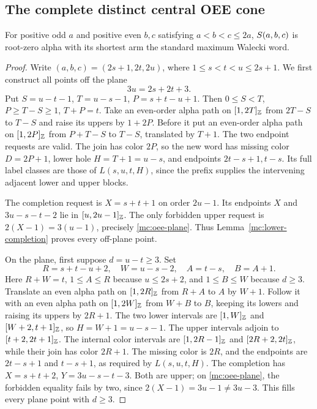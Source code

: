 \subsection{The complete distinct central OEE cone}
\label{mc:oee-central-section}

\begin{proposition}\label{mc:oee-central}
For positive odd $a$ and positive even $b,c$ satisfying
$a<b<c\le2a$, $S\!\left(a,b,c\right)$ is root-zero alpha with its
shortest arm the standard maximum Walecki word.
\end{proposition}
\begin{proof}
Write $(a,b,c)=(2s+1,2t,2u)$, where
$1\le s<t<u\le2s+1$.
We first construct all points off the plane
\begin{equation}\label{mc:oee-plane}
 3u=2s+2t+3.
\end{equation}
Put $S=u-t-1$, $T=u-s-1$, $P=s+t-u+1$.
Then $0\le S<T$, $P\ge T-S\ge1$, $T+P=t$.
Take an even-order alpha path on $[1,2T]_{\mathbb Z}$
from $2T-S$ to $T-S$ and raise its uppers by $1+2P$.
Before it put an even-order alpha path on $[1,2P]_{\mathbb Z}$
from $P+T-S$ to $T-S$, translated by $T+1$.
The two endpoint requests are valid.  The join has color $2P$,
so the new word has missing color $D=2P+1$, lower hole
$H=T+1=u-s$, and endpoints $2t-s+1,t-s$.
Its full label classes are those of $L(s,u,t,H)$, since the
prefix supplies the intervening adjacent lower and upper blocks.

The completion request is $X=s+t+1$ on order $2u-1$.
Its endpoints $X$ and $3u-s-t-2$ lie in
$[u,2u-1]_{\mathbb Z}$.  The only forbidden upper request is
$2(X-1)=3(u-1)$, precisely \eqref{mc:oee-plane}.
Thus Lemma~\ref{mc:lower-completion} proves every off-plane point.

On the plane, first suppose $d=u-t\ge3$.  Set
\[
 R=s+t-u+2,\quad W=u-s-2,\quad A=t-s,\quad B=A+1.
\]
Here $R+W=t$, $1\le A\le R$ because $u\le2s+2$, and
$1\le B\le W$ because $d\ge3$.
Translate an even alpha path on $[1,2R]_{\mathbb Z}$ from
$R+A$ to $A$ by $W+1$.  Follow it with an even alpha path on
$[1,2W]_{\mathbb Z}$ from $W+B$ to $B$, keeping its lowers and
raising its uppers by $2R+1$.
The two lower intervals are $[1,W]_{\mathbb Z}$ and
$[W+2,t+1]_{\mathbb Z}$, so $H=W+1=u-s-1$.
The upper intervals adjoin to $[t+2,2t+1]_{\mathbb Z}$.
The internal color intervals are $[1,2R-1]_{\mathbb Z}$ and
$[2R+2,2t]_{\mathbb Z}$, while their join has color $2R+1$.
The missing color is $2R$, and the endpoints are
$2t-s+1$ and $t-s+1$, as required by $L(s,u,t,H)$.
The completion has $X=s+t+2$, $Y=3u-s-t-3$.
Both are upper; on \eqref{mc:oee-plane}, the forbidden equality
fails by two, since $2(X-1)=3u-1\ne3u-3$.
This fills every plane point with $d\ge3$.


\end{proof}
